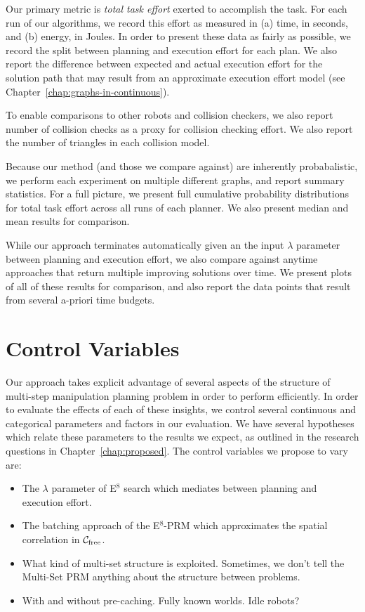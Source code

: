 Our primary metric is \emph{total task effort} exerted to accomplish
the task.
For each run of our algorithms,
we record this effort as measured in
(a) time, in seconds,
and (b) energy, in Joules.
In order to present these data as fairly as possible,
we record the split between planning and execution effort
for each plan.
We also report the difference between expected and actual
execution effort for the solution path
that may result from an approximate execution effort model
(see Chapter~\ref{chap:graphs-in-continuous}).

To enable comparisons to other robots and collision checkers,
we also report number of collision checks as a proxy for collision
checking effort.
We also report the number of triangles in each collision model.

Because our method (and those we compare against)
are inherently probabalistic,
we perform each experiment on multiple different graphs,
and report summary statistics.
For a full picture,
we present full cumulative probability distributions
for total task effort across all runs of each planner.
We also present median and mean results for comparison.

While our approach terminates automatically
given an the input $\lambda$ parameter between planning and execution
effort,
we also compare against anytime approaches that return multiple
improving solutions over time.
We present plots of all of these results for comparison,
and also report the data points that result from several
a-priori time budgets.

\section{Control Variables}

Our approach takes explicit advantage of several aspects of the
structure of multi-step manipulation planning problem
in order to perform efficiently.
In order to evaluate the effects of each of these insights,
we control several continuous and categorical
parameters and factors in our evaluation.
We have several hypotheses which relate these parameters to
the results we expect,
as outlined in the research questions in Chapter~\ref{chap:proposed}.
The control variables we propose to vary are:
\begin{itemize}
\item The $\lambda$ parameter of E$^8$ search
   which mediates between planning and execution effort.
\item The batching approach of the E$^8$-PRM
   which approximates the spatial correlation in
   $\mathcal{C}_{\mbox{\scriptsize free}}$.
\item What kind of multi-set structure is exploited.
   Sometimes, we don't tell the Multi-Set PRM anything about the
   structure between problems.
\item With and without pre-caching.
   Fully known worlds.
   Idle robots?
\end{itemize}

